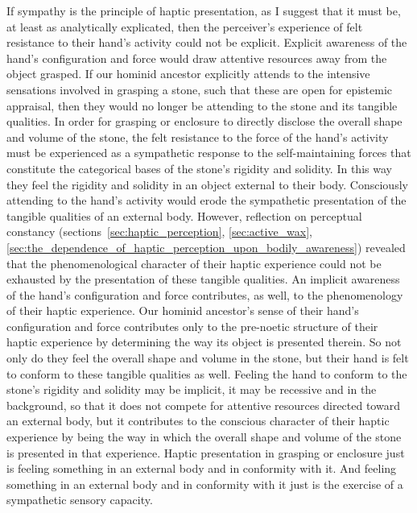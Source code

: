If sympathy is the principle of haptic presentation, as I suggest that it must be, at least as analytically explicated, then the perceiver's experience of felt resistance to their hand's activity could not be explicit. Explicit awareness of the hand's configuration and force would draw attentive resources away from the object grasped. If our hominid ancestor explicitly attends to the intensive sensations involved in grasping a stone, such that these are open for epistemic appraisal, then they would no longer be attending to the stone and its tangible qualities. In order for grasping or enclosure to directly disclose the overall shape and volume of the stone, the felt resistance to the force of the hand's activity must be experienced as a sympathetic response to the self-maintaining forces that constitute the categorical bases of the stone's rigidity and solidity. In this way they feel the rigidity and solidity in an object external to their body. Consciously attending to the hand's activity would erode the sympathetic presentation of the tangible qualities of an external body. However, reflection on perceptual constancy (sections~\ref{sec:haptic_perception}, \ref{sec:active_wax}, \ref{sec:the_dependence_of_haptic_perception_upon_bodily_awareness}) revealed that the phenomenological character of their haptic experience could not be exhausted by the presentation of these tangible qualities. An implicit awareness of the hand's configuration and force contributes, as well, to the phenomenology of their haptic experience. Our hominid ancestor's sense of their hand’s configuration and force contributes only to the pre-noetic structure of their haptic experience by determining the way its object is presented therein. So not only do they feel the overall shape and volume in the stone, but their hand is felt to conform to these tangible qualities as well. Feeling the hand to conform to the stone's rigidity and solidity may be implicit, it may be recessive and in the background, so that it does not compete for attentive resources directed toward an external body, but it contributes to the conscious character of their haptic experience by being the way in which the overall shape and volume of the stone is presented in that experience. Haptic presentation in grasping or enclosure just is feeling something in an external body and in conformity with it. And feeling something in an external body and in conformity with it just is the exercise of a sympathetic sensory capacity.

